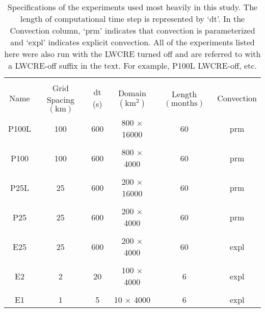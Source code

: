 \documentclass[draft]{agujournal2019}
\begin{document}
\begin{table}

\begin{center}
\caption{Specifications of the experiments used most heavily in this study.  The length of computational time step is represented by `dt'.  In the Convection
column, `prm'  indicates that convection is parameterized and `expl' indicates explicit convection.
All of the experiments listed here were also run with the LWCRE turned off and are referred to with a LWCRE-off suffix in the text.
For example, P100L LWCRE-off, etc.  }
    \begin{tabular}{*{6}{c}}
    \hline
    \hline
    \\
 Name & Grid Spacing $(\mathrm{km})$ & dt (s) & Domain $ (\mathrm{km^2}) $& Length $(\mathrm{months}) $ & Convection     \\ \hline
  P100L &  100      & 600    &   800 $\times$ 16000    &  60              & prm                   \\ 
    \\
  P100 &  100     & 600           & 800 $\times$ 4000     & 60            & prm                     \\  
    \\
  P25L &  25    & 600         & 200 $\times$ 16000      & 60             & prm                     \\  
    \\
  P25  &  25    & 600         & 200 $\times$ 4000      & 60             & prm                   \\  
    \\
 E25  &   25   & 600       & 200 $\times$ 4000      & 60             & expl                \\  
    \\
 E2   &   2   & 20       & 100 $\times$ 4000      & 6             & expl                   \\ 
    \\
 E1   &   1    & 5      & 10 $\times$ 4000      & 6             & expl                 \\  \hline

    \end{tabular}\par
    \label{tab:experimentspecs}
\end{center}
\end{table}
\end{document}
